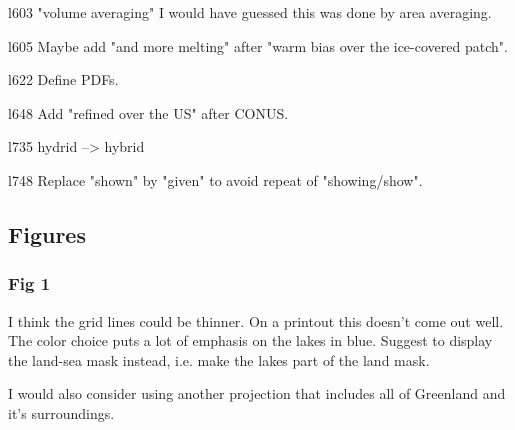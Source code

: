 \documentclass[12pt,oneside,a4paper]{article}%
\begin{document}
l603 "volume averaging" I would have guessed this was done by area averaging. \newline

{\color{blue}{Fair point. Changed to area averaging.}} \newline

l605 Maybe add "and more melting" after "warm bias over the ice-covered patch". \newline

{\color{blue}{Done.}} \newline

l622 Define PDFs. \newline

{\color{blue}{Done.}} \newline

l648 Add "refined over the US" after CONUS. \newline

{\color{blue}{Done.}} \newline

l735 hydrid --> hybrid \newline

{\color{blue}{Done.}} \newline

l748 Replace "shown" by "given" to avoid repeat of "showing/show". \newline

{\color{blue}{Done.}}

\subsection*{Figures}


\subsubsection*{Fig 1}
I think the grid lines could be thinner. On a printout this doesn't come out well. \newline
The color choice puts a lot of emphasis on the lakes in blue. Suggest to display the land-sea mask instead, i.e. make the lakes part of the land mask. \newline

{\color{blue}{Thinned the lines by half and changed the lake colors to tan/land.}} \newline

I would also consider using another projection that includes all of Greenland and it's surroundings. \newline
\end{document}
